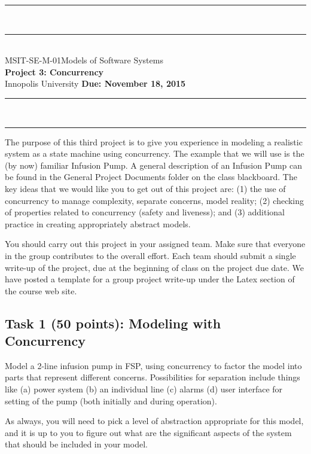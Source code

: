 \documentclass{article}
\newcommand{\head}{\subsection*}
\begin{document}
\begin{center}
\rule{\textwidth}{1.5pt} \\ \rule[10pt]{\textwidth}{1pt}\\
MSIT-SE-M-01\hfill Models of Software Systems\\[3ex]
{\Large\bf Project 3: Concurrency}\\[3ex]
Innopolis University \hfill {\bf Due: November 18, 2015} \rule{\textwidth}{1pt}
\\\rule[9.5pt]{\textwidth}{1.5pt}
\end{center}

The purpose of this third project is to give you experience in
modeling a realistic system as a state machine using concurrency.
The example that we will use is the (by now) familiar Infusion Pump.
A general description of an Infusion Pump can be found in the
General Project Documents folder on the class blackboard. The key
ideas that we would like you to get out of this project are: (1) the
use of concurrency to manage complexity, separate concerns, model
reality; (2) checking of properties related to concurrency (safety
and liveness); and (3) additional practice in creating appropriately
abstract models.

\bigskip You should carry out this project in your assigned team. Make sure that everyone in the
group contributes to the overall effort. Each team should submit a single write-up of the project,
due at the beginning of class on the project due date. We have posted a template for a group
project write-up under the Latex section of the course web site.

\head{Task 1 (50 points): Modeling with Concurrency}

Model a 2-line infusion pump in FSP, using concurrency to factor the model into parts that
represent different concerns. Possibilities for separation include things like (a) power system (b) an individual line
(c) alarms (d) user interface for setting of the pump (both initially and during operation).

\bigskip

As always, you will need to pick a level of abstraction appropriate for this model, and it is up to
you to figure out what are the significant aspects of the system that should be included in your
model.\\
\end{document}
